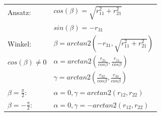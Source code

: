 \begin{minipage}{9.5cm}
\begin{tabular}{|p{2.5cm}|p{6cm}|}
        \hline
			Ansatz:
& $cos(\beta) = \sqrt{r^2_{11} + r^2_{21}}$ \\
& $sin(\beta) = -r_{31}$\\
\hline
Winkel:
& $\beta=arctan2(-r_{31},\sqrt{r^2_{11}+r^2_{21}})$\\
$cos(\beta) \neq 0 $ &$\alpha=arctan2(\frac{r_{21}}{cos\beta},\frac{r_{11}}{cos\beta})$\\
& $\gamma=arctan2(\frac{r_{32}}{cos\beta},\frac{r_{33}}{cos\beta})$\\
\hline
$\beta=\frac{\pi}{2}$:
& $\alpha=0,\gamma=arctan2(r_{12},r_{22})$\\
$\beta=-\frac{\pi}{2}$:
& $\alpha=0,\gamma=-arctan2(r_{12},r_{22})$\\
\hline
        
    \end{tabular}
    
    
    
\end{minipage}
